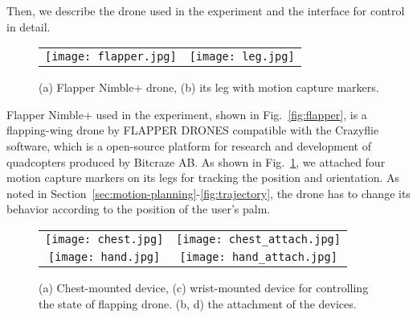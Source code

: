Then, we describe the drone used in the experiment and the interface for control in detail.
\begin{figure}[b]
  \centering
  \begin{tabular}{cc}
      \begin{minipage}[t]{0.4 \columnwidth}
        \centering
        \texttt{[image: flapper.jpg]}
        \subcaption{}
        \label{fig:flapper}
      \end{minipage} &
      \begin{minipage}[t]{0.4 \columnwidth}
        \centering
        \texttt{[image: leg.jpg]}
        \subcaption{}
        \label{fig:leg}
      \end{minipage}
    \end{tabular}
  \caption{(a) Flapper Nimble+ drone, (b) its leg with motion capture markers.}
\end{figure}
Flapper Nimble+ \cite{company_product} used in the experiment, shown in Fig.~\ref{fig:flapper}, is a flapping-wing drone by FLAPPER DRONES compatible with the Crazyflie software, 
which is a open-source platform for research and development of quadcopters produced by Bitcraze AB. 
As shown in Fig.~\ref{fig:leg}, we attached four motion capture markers on its legs for tracking the position and orientation. 
As noted in Section~\ref{sec:motion-planning}-\ref{fig:trajectory}, the drone has to change its behavior according to the position of the user's palm.
\begin{figure}[t]
  \centering
  \begin{tabular}{cc}
      \begin{minipage}[t]{0.4 \columnwidth}
        \centering
        \texttt{[image: chest.jpg]}
        \subcaption{}
        \label{fig:chest}
      \end{minipage} &
      \begin{minipage}[t]{0.4 \columnwidth}
        \centering
        \texttt{[image: chest\_attach.jpg]}
        \subcaption{}
        \label{fig:chest_attach}
      \end{minipage} \\
      \begin{minipage}[t]{0.4 \columnwidth}
        \centering
        \texttt{[image: hand.jpg]}
        \subcaption{}
        \label{fig:hand}
      \end{minipage} &
      \begin{minipage}[t]{0.4 \columnwidth}
        \centering
        \texttt{[image: hand\_attach.jpg]}
        \subcaption{}
        \label{fig:hand_attach}
      \end{minipage}
    \end{tabular}
  \caption{(a) Chest-mounted device, (c) wrist-mounted device for controlling the state of flapping drone. (b, d) the attachment of the devices.}
\end{figure}
